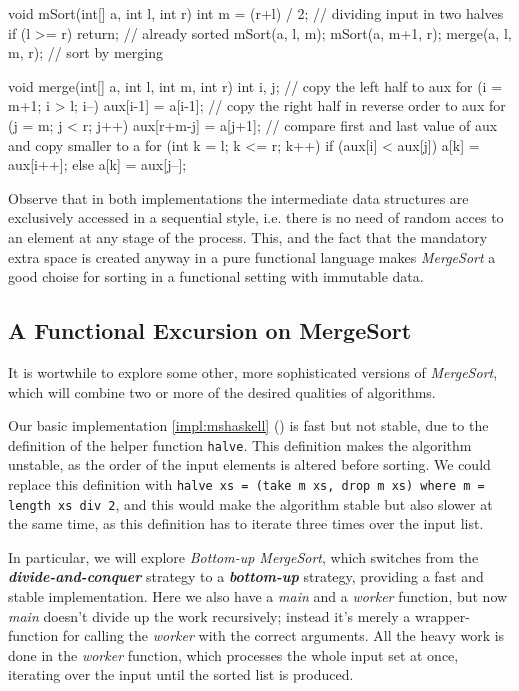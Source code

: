 \begin{javacode}
void mSort(int[] a, int l, int r) {
    int m = (r+l) / 2; // dividing input in two halves
    if (l >= r) return; // already sorted
    mSort(a, l, m);
    mSort(a, m+1, r);
    merge(a, l, m, r); // sort by merging
}

void merge(int[] a, int l, int m, int r) {
    int i, j;
    // copy the left half to aux
    for (i = m+1; i > l; i--) aux[i-1] = a[i-1];
    // copy the right half in reverse order to aux
    for (j = m; j < r; j++) aux[r+m-j] = a[j+1];
    // compare first and last value of aux and copy smaller to a
    for (int k = l; k <= r; k++) {
        if (aux[i] < aux[j]) a[k] = aux[i++];
        else a[k] = aux[j--];
    }
}
\end{javacode}

Observe that in both implementations the intermediate data structures are exclusively accessed in a sequential style, i.e. there is no need of random acces to an element at any stage of the process.
This, and the fact that the mandatory extra space is created anyway in a pure functional language makes \emph{MergeSort} a good choise for sorting in a functional setting with immutable data.

\subsection{A Functional Excursion on MergeSort}
It is wortwhile to explore some other, more sophisticated versions of \emph{MergeSort}, which will combine two or more of the desired qualities of algorithms.

Our basic implementation \ref{impl:mshaskell} () is fast but not stable, due to the definition of the helper function \texttt{halve}.
This definition makes the algorithm unstable, as the order of the input elements is altered before sorting.
We could replace this definition with {\texttt{halve xs = (take m xs, drop m xs) where m = length xs div 2}}, and this would make the algorithm stable but also slower at the same time, as this definition has to iterate three times over the input list.

In particular, we will explore \emph{Bottom-up MergeSort}, which switches from the \emph{\textbf{divide-and-conquer}} strategy to a \emph{\textbf{bottom-up}} strategy, providing a fast and stable implementation.
Here we also have a \emph{main} and a \emph{worker} function, but now \emph{main} doesn't divide up the work recursively; instead it's merely a wrapper-function for calling the \emph{worker} with the correct arguments.
All the heavy work is done in the \emph{worker} function, which processes the whole input set at once, iterating over the input until the sorted list is produced.

